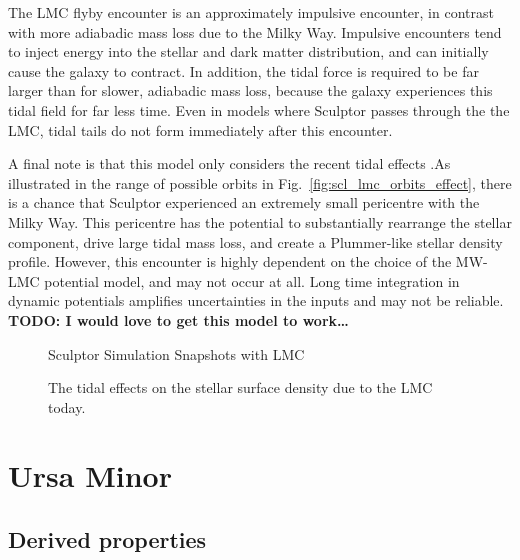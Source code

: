 The LMC flyby encounter is an approximately impulsive encounter, in
contrast with more adiabadic mass loss due to the Milky Way. Impulsive
encounters tend to inject energy into the stellar and dark matter
distribution, and can initially cause the galaxy to contract. In
addition, the tidal force is required to be far larger than for slower,
adiabadic mass loss, because the galaxy experiences this tidal field for
far less time. Even in models where Sculptor passes through the the LMC,
tidal tails do not form immediately after this encounter.

A final note is that this model only considers the recent tidal effects
.As illustrated in the range of possible orbits in
Fig.~\ref{fig:scl_lmc_orbits_effect}, there is a chance that Sculptor
experienced an extremely small pericentre with the Milky Way. This
pericentre has the potential to substantially rearrange the stellar
component, drive large tidal mass loss, and create a Plummer-like
stellar density profile. However, this encounter is highly dependent on
the choice of the MW-LMC potential model, and may not occur at all. Long
time integration in dynamic potentials amplifies uncertainties in the
inputs and may not be reliable. \textbf{TODO: I would love to get this
model to work\ldots{}}

\begin{figure}
\centering
{}
\caption{Sculptor Simulation Snapshots with
LMC}\label{fig:scl_lmc_sim_images}
\end{figure}

\begin{figure}
\centering
{}
\caption[Sculptor initial and final density with LMC]{The tidal effects
on the stellar surface density due to the LMC today.}
\end{figure}

\section{Ursa Minor}\label{ursa-minor}

\subsection{Derived properties}\label{derived-properties}

